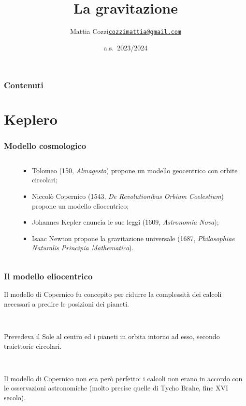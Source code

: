 \documentclass[]{beamer}
\title{La gravitazione}
\author{\texorpdfstring{Mattia Cozzi\newline\href{mailto:cozzimattia@gmail.com}{\texttt{cozzimattia@gmail.com}}}{Mattia Cozzi}}
\date{a.s.~2023/2024}
\theoremstyle{plain}
\begin{document}
\begin{frame}
  \titlepage
\end{frame}





\begin{frame}
\frametitle{Contenuti}
\tableofcontents
\end{frame}


\section{Keplero}


\begin{frame}
\frametitle{Modello cosmologico}
\begin{columns}
\begin{column}{0.2\textwidth}
~
~
\end{column}
\begin{column}{0.6\textwidth}
\begin{itemize}
\item<1-> Tolomeo (150, \emph{Almagesto}) propone un modello \alert<1>{geocentrico} con orbite circolari;
\item<2-> Niccolò Copernico (1543, \emph{De Revolutionibus Orbium Coelestium}) propone un modello \alert<2>{eliocentrico};
\item<3-> Johannes Kepler enuncia le sue \alert<3>{leggi} (1609, \emph{Astronomia Nova});
\item<4-> Isaac Newton propone la \alert<4>{gravitazione universale} (1687, \emph{Philosophiae Naturalis Principia Mathematica}).
\end{itemize}
\end{column}
\end{columns}
\end{frame}

\begin{frame}
\frametitle{Il modello eliocentrico}
Il modello di Copernico fu concepito per ridurre la complessità dei calcoli necessari a predire le posizioni dei pianeti.

~

Prevedeva il Sole al centro ed i pianeti in orbita intorno ad esso, secondo \alert{traiettorie circolari}.

~

Il modello di Copernico non era però perfetto: i calcoli non erano in accordo con le osservazioni astronomiche (molto precise quelle di Tycho Brahe, fine XVI secolo).
\end{frame}
\end{document}
